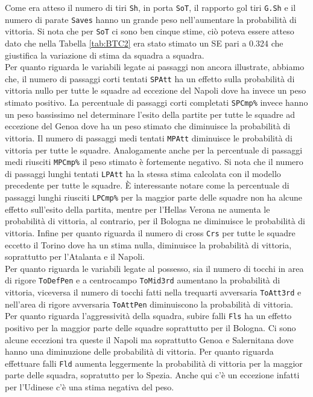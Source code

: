 Come era atteso il numero di tiri \texttt{Sh}, in porta \texttt{SoT}, il rapporto gol tiri \texttt{G.Sh} e il numero di parate \texttt{Saves} hanno un grande peso nell'aumentare la probabilità di vittoria. Si nota che per \texttt{SoT} ci sono ben cinque stime, ciò poteva essere atteso dato che nella Tabella \ref{tab:BTC2} era stato stimato un SE pari a 0.324 che giustifica la variazione di stima da squadra a squadra. \\
Per quanto riguarda le variabili legate ai passaggi non ancora illustrate, abbiamo che,
il numero di passaggi corti tentati \texttt{SPAtt} ha un effetto sulla probabilità di vittoria nullo per tutte le squadre ad eccezione del Napoli dove ha invece un peso stimato positivo. La percentuale di passaggi corti completati \texttt{SPCmp\%} invece hanno un peso bassissimo nel determinare l'esito della partite per tutte le squadre ad eccezione del Genoa dove ha un peso stimato che diminuisce la probabilità di vittoria. Il numero di passaggi medi tentati \texttt{MPAtt} diminuisce le probabilità di vittoria per tutte le squadre. Analogamente anche per la percentuale di passaggi medi riusciti \texttt{MPCmp\%} il peso stimato è fortemente negativo. Si nota che il numero di passaggi lunghi tentati \texttt{LPAtt} ha la stessa stima calcolata con il modello precedente per tutte le squadre. È interessante notare come la percentuale di passaggi lunghi riusciti \texttt{LPCmp\%} per la maggior parte delle squadre non ha alcune effetto sull'esito della partita, mentre per l'Hellas Verona ne aumenta le probabilità di vittoria, al contrario, per il Bologna ne diminuisce le probabilità di vittoria. Infine per quanto riguarda il numero di cross \texttt{Crs} per tutte le squadre eccetto il Torino dove ha un stima nulla, diminuisce la probabilità di vittoria, soprattutto per l'Atalanta e il Napoli.\\
Per quanto riguarda le variabili legate al possesso, sia il numero di tocchi in area di rigore \texttt{ToDefPen} e a centrocampo \texttt{ToMid3rd} aumentano la probabilità di vittoria, viceversa il numero di tocchi fatti nella trequarti avversaria \texttt{ToAtt3rd} e nell'area di rigore avversaria \texttt{ToAttPen} diminuiscono la probabilità di vittoria.\\
Per quanto riguarda l'aggressività della squadra, subire falli \texttt{Fls} ha un effetto positivo per la maggior parte delle squadre soprattutto per il Bologna. Ci sono alcune eccezioni tra queste il Napoli ma soprattutto Genoa e Salernitana dove hanno una diminuzione delle probabilità di vittoria. Per quanto riguarda effettuare falli \texttt{Fld} aumenta leggermente la probabilità di vittoria per la maggior parte delle squadra, sopratutto per lo Spezia. Anche qui c'è un eccezione infatti per l'Udinese c'è una stima negativa del peso.\\
